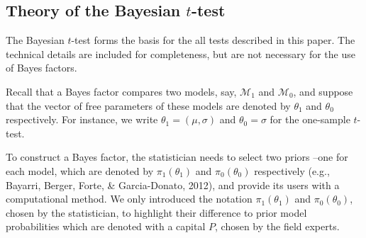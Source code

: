 \documentclass[english,,doc,floatsintext]{apa6}
\begin{document}
\hypertarget{theory-of-the-bayesian-t-test}{%
\subsection{\texorpdfstring{Theory of the Bayesian \(t\)-test}{Theory of the Bayesian t-test}}\label{theory-of-the-bayesian-t-test}}

The Bayesian \(t\)-test forms the basis for the all tests described in this paper. The technical details are included for completeness, but are not necessary for the use of Bayes factors.

Recall that a Bayes factor compares two models, say, \(\mathcal{M}_{1}\) and \(\mathcal{M}_{0}\), and suppose that the vector of free parameters of these models are denoted by \(\theta_{1}\) and \(\theta_{0}\) respectively. For instance, we write \(\theta_{1} = ( \mu, \sigma)\) and \(\theta_{0} = \sigma\) for the one-sample \(t\)-test.

To construct a Bayes factor, the statistician needs to select two priors --one for each model, which are denoted by \(\pi_{1} (\theta_{1})\) and \(\pi_{0} (\theta_{0})\) respectively (e.g., Bayarri, Berger, Forte, \& Garcia-Donato, 2012), and provide its users with a computational method. We only introduced the notation \(\pi_{1} (\theta_{1})\) and \(\pi_{0} (\theta_{0})\), chosen by the statistician, to highlight their difference to prior model probabilities which are denoted with a capital \(P\), chosen by the field experts.
\end{document}
